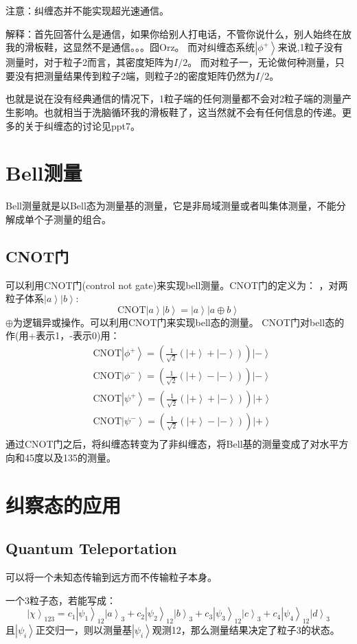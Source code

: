\documentclass[10pt,a4paper,nocap]{ctexart}
\newcommand{\ket}[1]{\left|#1\right>}
\begin{document}
注意：纠缠态并不能实现超光速通信。

解释：首先回答什么是通信，如果你给别人打电话，不管你说什么，别人始终在放我的滑板鞋，这显然不是通信。。。囧Orz。
而对纠缠态系统\(\ket{\phi^+}\)来说,1粒子没有测量时，对于粒子2而言，其密度矩阵为\(I/2\)。 而对粒子一，无论做何种测量，只要没有把测量结果传到粒子2端，则粒子2的密度矩阵仍然为\(I/2\)。

也就是说在没有经典通信的情况下，1粒子端的任何测量都不会对2粒子端的测量产生影响。也就相当于洗脑循环我的滑板鞋了，这当然就不会有任何信息的传递。更多的关于纠缠态的讨论见ppt7。
\section{Bell测量}
Bell测量就是以Bell态为测量基的测量，它是非局域测量或者叫集体测量，不能分解成单个子测量的组合。
\subsection{CNOT门}
可以利用CNOT门(control not gate)来实现bell测量。CNOT门的定义为： ，对两粒子体系\(\ket{a}\ket{b}\):\[\mathrm{CNOT}\ket{a}\ket{b} = \ket{a}\ket{a\oplus b}\]
\(\oplus\)为逻辑异或操作。可以利用CNOT门来实现bell态的测量。
CNOT门对bell态的作(用+表示1，-表示0)用：
\begin{equation}
\begin{split}
&\mathrm{CNOT}\ket{\phi^+} = (\frac{1}{\sqrt{2}}(\ket{+}+\ket{-}))\ket{-}\\
&\mathrm{CNOT}\ket{\phi^-} =  (\frac{1}{\sqrt{2}}(\ket{+}-\ket{-}))\ket{-}\\
&\mathrm{CNOT}\ket{\psi^+} =  (\frac{1}{\sqrt{2}}(\ket{+}+\ket{-}))\ket{+}\\
& \mathrm{CNOT}\ket{\psi^-} = (\frac{1}{\sqrt{2}}(\ket{+}-\ket{-}))\ket{+}\\
\end{split}
\end{equation}
通过CNOT门之后，将纠缠态转变为了非纠缠态，将Bell基的测量变成了对水平方向和45\textdegree 度以及135\textdegree 的测量。
\section{纠察态的应用}
\subsection{Quantum Teleportation}
可以将一个未知态传输到远方而不传输粒子本身。

一个3粒子态，若能写成：\[\ket{\chi}_{123} = c_1\ket{\psi_1}_{12}\ket{a}_3 + c_2\ket{\psi_2}_{12}\ket{b}_3 + c_3\ket{\psi_3}_{12}\ket{c}_3 + c_4\ket{\psi_4}_{12}\ket{d}_3\]
且\(\ket{\psi_i}\)正交归一，则以测量基\(\ket{\psi_i}\)观测12，那么测量结果决定了粒子3的状态。
\end{document}

